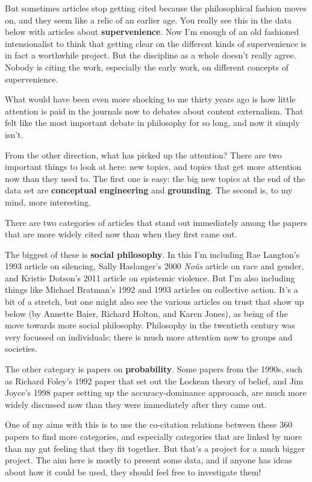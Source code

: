 \documentclass[
  10pt,
  letterpaper,
  DIV=11,
  numbers=noendperiod,
  twoside]{scrartcl}
\begin{document}
But sometimes articles stop getting cited because the philosophical
fashion moves on, and they seem like a relic of an earlier age. You
really see this in the data below with articles about
\textbf{supervenience}. Now I'm enough of an old fashioned
intensionalist to think that getting clear on the different kinds of
supervenience is in fact a worthwhile project. But the discipline as a
whole doesn't really agree. Nobody is citing the work, especially the
early work, on different concepts of supervenience.

What would have been even more shocking to me thirty years ago is how
little attention is paid in the journals now to debates about content
externalism. That felt like the most important debate in philosophy for
so long, and now it simply isn't.

From the other direction, what has picked up the attention? There are
two important things to look at here: new topics, and topics that get
more attention now than they used to. The first one is easy: the big new
topics at the end of the data set are \textbf{conceptual engineering}
and \textbf{grounding}. The second is, to my mind, more interesting.

There are two categories of articles that stand out immediately among
the papers that are more widely cited now than when they first came out.

The biggest of these is \textbf{social philosophy}. In this I'm
including Rae Langton's 1993 article on silencing, Sally Haslanger's
2000 \emph{Noûs} article on race and gender, and Kristie Dotson's 2011
article on epistemic violence. But I'm also including things like
Michael Bratman's 1992 and 1993 articles on collective action. It's a
bit of a stretch, but one might also see the various articles on trust
that show up below (by Annette Baier, Richard Holton, and Karen Jones),
as being of the move towards more social philosophy. Philosophy in the
twentieth century was very focussed on individuals; there is much more
attention now to groups and societies.

The other category is papers on \textbf{probability}. Some papers from
the 1990s, such as Richard Foley's 1992 paper that set out the Lockean
theory of belief, and Jim Joyce's 1998 paper setting up the
accuracy-dominance approoach, are much more widely discussed now than
they were immediately after they came out.

One of my aims with this is to use the co-citation relations between
these 360 papers to find more categories, and especially categories that
are linked by more than my gut feeling that they fit together. But
that's a project for a much bigger project. The aim here is mostly to
present some data, and if anyone has ideas about how it could be used,
they should feel free to investigate them!
\end{document}
